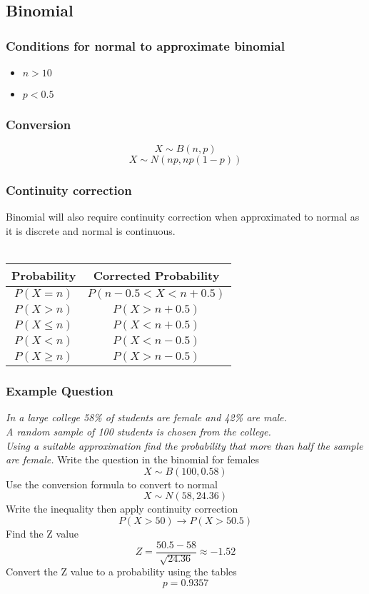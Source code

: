 \documentclass{article}[18pt]
\begin{document}
\subsection{Binomial}
\subsubsection{Conditions for normal to approximate binomial}
\begin{itemize}
\item $n>10$
\item $p<0.5$
\end{itemize}
\subsubsection{Conversion}
$$X\sim B(n,p)$$
$$X\sim N(np,np(1-p))$$
\subsubsection{Continuity correction}
Binomial will also require continuity correction when approximated to normal as it is discrete and normal is continuous.\\
\\
{\renewcommand{\arraystretch}{1.5}
\begin{tabular}{|c|c|}
\hline
Probability&Corrected Probability\\
\hline
$P(X=n)$&$P(n-0.5<X<n+0.5)$\\
\hline
$P(X>n)$&$P(X>n+0.5)$\\
\hline
$P(X\leqslant n)$ &$P(X<n+0.5)$\\
\hline
$P(X<n)$&$P(X<n-0.5)$\\
\hline
$P(X\geqslant n)$&$P(X>n-0.5)$\\
\hline
\end{tabular}}
\subsubsection{Example Question}
\textit{In a large college 58\% of students are female and 42\% are male.\\ A random sample of 100
students is chosen from the college.\\ Using a suitable approximation find the probability that
more than half the sample are female.}
Write the question in the binomial for females
$$X\sim B(100,0.58)$$
Use the conversion formula to convert to normal
$$X\sim N(58,24.36)$$
Write the inequality then apply continuity correction
$$P(X>50)\rightarrow P(X>50.5)$$
Find the Z value
$$Z=\frac{50.5-58}{\sqrt{24.36}}\approx-1.52$$
Convert the Z value to a probability using the tables
$$p=0.9357$$
\newpage
\end{document}
